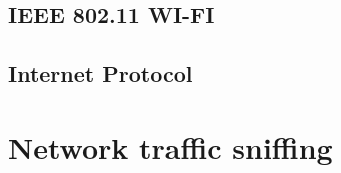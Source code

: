 \subsection{IEEE 802.11 WI-FI}

\subsection{Internet Protocol}

\section{Network traffic sniffing}




